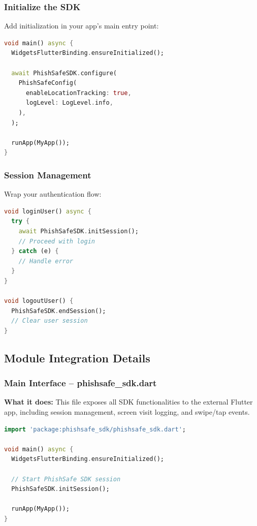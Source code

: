 \documentclass[11pt]{article}
\begin{document}
\subsubsection{Initialize the SDK}
Add initialization in your app's main entry point:

\begin{lstlisting}[language=Dart]
void main() async {
  WidgetsFlutterBinding.ensureInitialized();
  
  await PhishSafeSDK.configure(
    PhishSafeConfig(
      enableLocationTracking: true,
      logLevel: LogLevel.info,
    ),
  );
  
  runApp(MyApp());
}
\end{lstlisting}

\subsubsection{Session Management}
Wrap your authentication flow:

\begin{lstlisting}[language=Dart]
void loginUser() async {
  try {
    await PhishSafeSDK.initSession();
    // Proceed with login
  } catch (e) {
    // Handle error
  }
}

void logoutUser() {
  PhishSafeSDK.endSession();
  // Clear user session
}
\end{lstlisting}

\subsection{Module Integration Details}

\subsubsection{Main Interface – phishsafe\_sdk.dart}
\textbf{What it does:} This file exposes all SDK functionalities to the external Flutter app, including session management, screen visit logging, and swipe/tap events.

\begin{lstlisting}[language=Dart]
import 'package:phishsafe_sdk/phishsafe_sdk.dart';

void main() async {
  WidgetsFlutterBinding.ensureInitialized();

  // Start PhishSafe SDK session
  PhishSafeSDK.initSession();

  runApp(MyApp());
}
\end{lstlisting}
\end{document}

